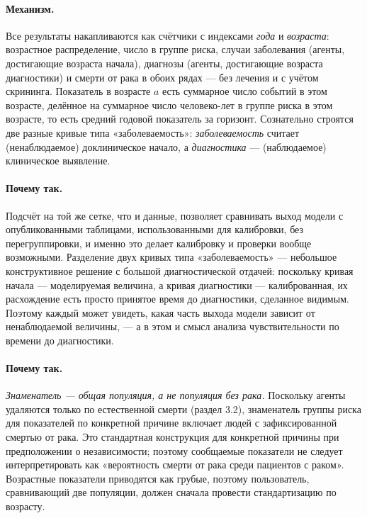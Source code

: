\documentclass[12pt,a4paper]{article}
\newcommand{\mech}[1]{\paragraph{Механизм.} #1}
\newcommand{\why}[1]{\paragraph{Почему так.} #1}
\begin{document}
\mech{Все результаты накапливаются как счётчики с индексами \emph{года} и \emph{возраста}: возрастное
распределение, число в группе риска, случаи заболевания (агенты, достигающие возраста начала), диагнозы
(агенты, достигающие возраста диагностики) и смерти от рака в обоих рядах --- без лечения и с учётом
скрининга. Показатель в возрасте $a$ есть суммарное число событий в этом возрасте, делённое на суммарное
число человеко-лет в группе риска в этом возрасте, то есть средний годовой показатель за горизонт.
Сознательно строятся две разные кривые типа «заболеваемость»: \emph{заболеваемость} считает
(ненаблюдаемое) доклиническое начало, а \emph{диагностика} --- (наблюдаемое) клиническое выявление.}

\why{Подсчёт на той же сетке, что и данные, позволяет сравнивать выход модели с опубликованными таблицами,
использованными для калибровки, без перегруппировки, и именно это делает калибровку и проверки вообще
возможными. Разделение двух кривых типа «заболеваемость» --- небольшое конструктивное решение с большой
диагностической отдачей: поскольку кривая начала --- моделируемая величина, а кривая диагностики ---
калиброванная, их расхождение есть просто принятое время до диагностики, сделанное видимым. Поэтому каждый
может увидеть, какая часть выхода модели зависит от ненаблюдаемой величины, --- а в этом и смысл анализа
чувствительности по времени до диагностики.}

\why{\emph{Знаменатель --- общая популяция, а не популяция без рака.} Поскольку агенты удаляются только по
естественной смерти (раздел 3.2), знаменатель группы риска для показателей по конкретной причине включает
людей с зафиксированной смертью от рака. Это стандартная конструкция для конкретной причины при
предположении о независимости; поэтому сообщаемые показатели не следует интерпретировать как «вероятность
смерти от рака среди пациентов с раком». Возрастные показатели приводятся как грубые, поэтому пользователь,
сравнивающий две популяции, должен сначала провести стандартизацию по возрасту.}
\end{document}
